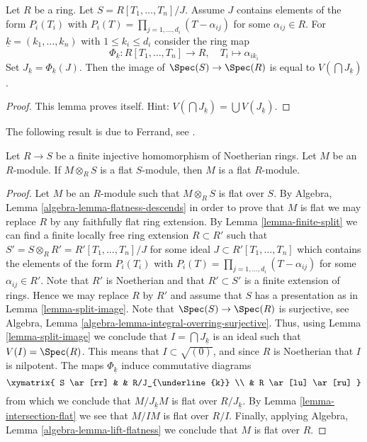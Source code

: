 \begin{lemma}
\label{lemma-split-image}
Let $R$ be a ring.
Let $S = R[T_1, \ldots, T_n]/J$.
Assume $J$ contains elements of the form $P_i(T_i)$
with $P_i(T) = \prod_{j = 1, \ldots, d_i} (T - \alpha_{ij})$ for some
$\alpha_{ij} \in R$. For $\underline{k} = (k_1, \ldots, k_n)$
with $1 \leq k_i \leq d_i$ consider the ring map
$$
\Phi_{\underline{k}} : R[T_1, \ldots, T_n] \to R,
\quad
T_i \longmapsto \alpha_{ik_i}
$$
Set $J_{\underline{k}} = \Phi_{\underline{k}}(J)$.
Then the image of $\Spec(S) \to \Spec(R)$ is equal to
$V(\bigcap J_{\underline{k}})$.
\end{lemma}

\begin{proof}
This lemma proves itself. Hint:
$V(\bigcap J_{\underline{k}}) = \bigcup V(J_{\underline{k}})$.
\end{proof}

\noindent
The following result is due to Ferrand, see \cite{Ferrand}.

\begin{lemma}
\label{lemma-descent-flatness-injective-finite-Noetherian-rings}
Let $R \to S$ be a finite injective homomorphism of Noetherian rings.
Let $M$ be an $R$-module. If $M \otimes_R S$ is a flat $S$-module,
then $M$ is a flat $R$-module.
\end{lemma}

\begin{proof}
Let $M$ be an $R$-module such that $M \otimes_R S$ is flat over $S$. By
Algebra, Lemma \ref{algebra-lemma-flatness-descends}
in order to prove that $M$ is flat we may replace $R$ by any faithfully flat
ring extension. By
Lemma \ref{lemma-finite-split}
we can find a finite locally free ring extension $R \subset R'$ such
that $S' = S \otimes_R R' = R'[T_1, \ldots, T_n]/J$ for some ideal
$J \subset R'[T_1, \ldots, T_n]$ which contains the  elements of the form
$P_i(T_i)$ with $P_i(T) = \prod_{j = 1, \ldots, d_i} (T - \alpha_{ij})$
for some $\alpha_{ij} \in R'$. Note that $R'$ is Noetherian
and that $R' \subset S'$ is a finite extension of rings. Hence we may
replace $R$ by $R'$ and assume that $S$ has a presentation as in
Lemma \ref{lemma-split-image}.
Note that $\Spec(S) \to \Spec(R)$ is surjective, see
Algebra, Lemma \ref{algebra-lemma-integral-overring-surjective}.
Thus, using
Lemma \ref{lemma-split-image}
we conclude that $I = \bigcap J_{\underline{k}}$ is an ideal
such that $V(I) = \Spec(R)$. This means that
$I \subset \sqrt{(0)}$, and since $R$ is Noetherian that $I$
is nilpotent. The maps $\Phi_{\underline{k}}$ induce commutative
diagrams
$$
\xymatrix{
S \ar[rr] & & R/J_{\underline{k}} \\
& R \ar[lu] \ar[ru]
}
$$
from which we conclude that $M/J_{\underline{k}}M$ is flat over
$R/J_{\underline{k}}$. By
Lemma \ref{lemma-intersection-flat}
we see that $M/IM$ is flat over $R/I$. Finally, applying
Algebra, Lemma \ref{algebra-lemma-lift-flatness}
we conclude that $M$ is flat over $R$.
\end{proof}

